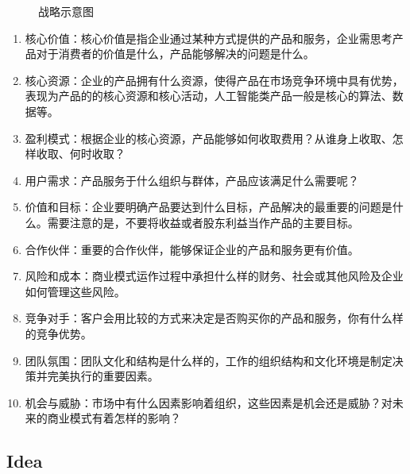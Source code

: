 \documentclass[letterpaper,11pt,english]{sphinxmanual}
\begin{document}
\begin{figure}[H]
\centering
\capstart

\noindent{}
\caption{战略示意图}\label{\detokenize{chapter_introduction/opportunity:id9}}\end{figure}
\begin{enumerate}
%
\item {} 
核心价值：核心价值是指企业通过某种方式提供的产品和服务，企业需思考产品对于消费者的价值是什么，产品能够解决的问题是什么。

\item {} 
核心资源：企业的产品拥有什么资源，使得产品在市场竞争环境中具有优势，表现为产品的的核心资源和核心活动，人工智能类产品一般是核心的算法、数据等。

\item {} 
盈利模式：根据企业的核心资源，产品能够如何收取费用？从谁身上收取、怎样收取、何时收取？

\item {} 
用户需求：产品服务于什么组织与群体，产品应该满足什么需要呢？

\item {} 
价值和目标：企业要明确产品要达到什么目标，产品解决的最重要的问题是什么。需要注意的是，不要将收益或者股东利益当作产品的主要目标。

\item {} 
合作伙伴：重要的合作伙伴，能够保证企业的产品和服务更有价值。

\item {} 
风险和成本：商业模式运作过程中承担什么样的财务、社会或其他风险及企业如何管理这些风险。

\item {} 
竞争对手：客户会用比较的方式来决定是否购买你的产品和服务，你有什么样的竞争优势。

\item {} 
团队氛围：团队文化和结构是什么样的，工作的组织结构和文化环境是制定决策并完美执行的重要因素。

\item {} 
机会与威胁：市场中有什么因素影响着组织，这些因素是机会还是威胁？对未来的商业模式有着怎样的影响？

\end{enumerate}


\subsection{Idea}
\label{\detokenize{chapter_idea/index:chap-idea}}\label{\detokenize{chapter_idea/index:idea}}\label{\detokenize{chapter_idea/index::doc}}
\end{document}
